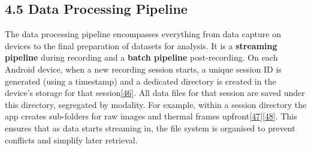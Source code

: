\documentclass[12pt,a4paper]{article}
\begin{document}
\subsection{4.5 Data Processing Pipeline}\label{data-processing-pipeline}

The data processing pipeline encompasses everything from data capture on devices to the final preparation of datasets for analysis. It is a \textbf{streaming pipeline} during recording and a \textbf{batch pipeline} post-recording. On each Android device, when a new recording session starts, a unique session ID is generated (using a timestamp) and a dedicated directory is created in the device's storage for that session\href{https://github.com/buccancs/GSR-Dual-Video-System/blob/05ae360cb7b4ae7c7861f72deb235ad64a74b38e/android/app/src/main/java/com/yourcompany/gsrcapture/manager/SessionManager.kt\#L14-L22}{{[}46{]}}. All data files for that session are saved under this directory, segregated by modality. For example, within a session directory the app creates sub-folders for raw images and thermal frames upfront\href{https://github.com/buccancs/GSR-Dual-Video-System/blob/05ae360cb7b4ae7c7861f72deb235ad64a74b38e/android/app/src/main/java/com/yourcompany/gsrcapture/manager/SessionManager.kt\#L22-L30}{{[}47{]}}\href{https://github.com/buccancs/GSR-Dual-Video-System/blob/05ae360cb7b4ae7c7861f72deb235ad64a74b38e/android/app/src/main/java/com/yourcompany/gsrcapture/manager/SessionManager.kt\#L32-L40}{{[}48{]}}. This ensures that as data starts streaming in, the file system is organised to prevent conflicts and simplify later retrieval.
\end{document}
